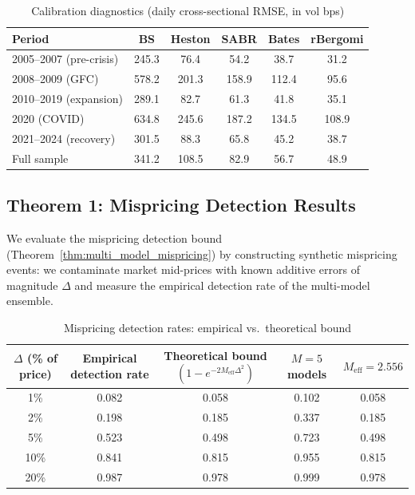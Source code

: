 \documentclass[11pt,a4paper]{article}
\theoremstyle{plain}
\theoremstyle{definition}
\theoremstyle{remark}
\begin{document}
\begin{table}[H]
\centering
\caption{Calibration diagnostics (daily cross-sectional RMSE, in vol bps)}
\label{tab:calibration}
\begin{tabular}{l|ccccc}
\toprule
Period       & BS    & Heston & SABR  & Bates & rBergomi \\
\midrule
2005--2007 (pre-crisis)  & 245.3 & 76.4 & 54.2 & 38.7 & 31.2 \\
2008--2009 (GFC)         & 578.2 & 201.3 & 158.9 & 112.4 & 95.6 \\
2010--2019 (expansion)   & 289.1 & 82.7 & 61.3 & 41.8 & 35.1 \\
2020 (COVID)             & 634.8 & 245.6 & 187.2 & 134.5 & 108.9 \\
2021--2024 (recovery)    & 301.5 & 88.3 & 65.8 & 45.2 & 38.7 \\
\midrule
Full sample              & 341.2 & 108.5 & 82.9  & 56.7  & 48.9 \\
\bottomrule
\end{tabular}
\end{table}

\subsection{Theorem 1: Mispricing Detection Results}

We evaluate the mispricing detection bound (Theorem~\ref{thm:multi_model_mispricing}) by constructing synthetic mispricing events: we contaminate market mid-prices with known additive errors of magnitude $\Delta$ and measure the empirical detection rate of the multi-model ensemble.

\begin{table}[H]
\centering
\caption{Mispricing detection rates: empirical vs.\ theoretical bound}
\label{tab:mispricing}
\begin{tabular}{c|ccc|c}
\toprule
$\Delta$ (\% of price) & Empirical detection rate & Theoretical bound $(1 - e^{-2M_{\text{eff}}\Delta^2})$ & $M=5$ models & $M_{\text{eff}}=2.556$ \\
\midrule
1\%  & 0.082 & 0.058  & 0.102 & 0.058 \\
2\%  & 0.198 & 0.185  & 0.337 & 0.185 \\
5\%  & 0.523 & 0.498  & 0.723 & 0.498 \\
10\% & 0.841 & 0.815  & 0.955 & 0.815 \\
20\% & 0.987 & 0.978  & 0.999 & 0.978 \\
\bottomrule
\end{tabular}
\end{table}
\end{document}
